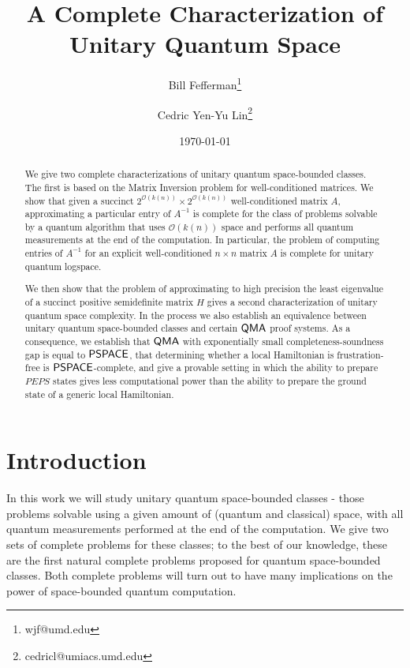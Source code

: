 \documentclass[11pt]{article}
\theoremstyle{definition}
\theoremstyle{remark}
\theoremstyle{definition}
\newcommand\QMA{{\sf{QMA}}}
\newcommand\PSPACE{{\sf{PSPACE}}}
\begin{document}
\begin{titlepage}
\title{A Complete Characterization of Unitary Quantum Space}
\author[1]{Bill Fefferman\thanks{wjf@umd.edu}}
\author[1]{Cedric Yen-Yu Lin\thanks{cedricl@umiacs.umd.edu}}
\date{\today}
\maketitle
\begin{abstract}
We give two complete characterizations of unitary quantum space-bounded classes.  The first is based on the Matrix Inversion problem for well-conditioned matrices.  We show that given a succinct $2^{\mathcal{O}(k(n))} \times 2^{\mathcal{O}(k(n))}$ well-conditioned matrix $A$, approximating a particular entry of $A^{-1}$ is complete for the class of problems solvable by a quantum algorithm that uses $\mathcal{O}(k(n))$ space and performs all quantum measurements at the end of the computation. In particular, the problem of computing entries of $A^{-1}$ for an explicit well-conditioned $n \times n$ matrix $A$ is complete for unitary quantum logspace.

We then show that the problem of approximating to high precision the least eigenvalue of a succinct positive semidefinite matrix $H$ gives a second characterization of unitary quantum space complexity. In the process we also establish an equivalence between unitary quantum space-bounded classes and certain $\QMA$ proof systems. As a consequence, we establish that $\QMA$ with exponentially small completeness-soundness gap is equal to $\PSPACE$, that determining whether a local Hamiltonian is frustration-free is $\PSPACE$-complete, and give a provable setting in which the ability to prepare $PEPS$ states gives less computational power than the ability to prepare the ground state of a generic local Hamiltonian.
\end{abstract}
\thispagestyle{empty}
\end{titlepage}
\clearpage
\setcounter{page}{1}
\section{Introduction}
In this work we will study unitary quantum space-bounded classes - those problems solvable using a given amount of (quantum and classical) space, with all quantum measurements performed at the end of the computation. We give two sets of complete problems for these classes; to the best of our knowledge, these are the first natural complete problems proposed for quantum space-bounded classes. Both complete problems will turn out to have many implications on the power of space-bounded quantum computation.
\end{document}
